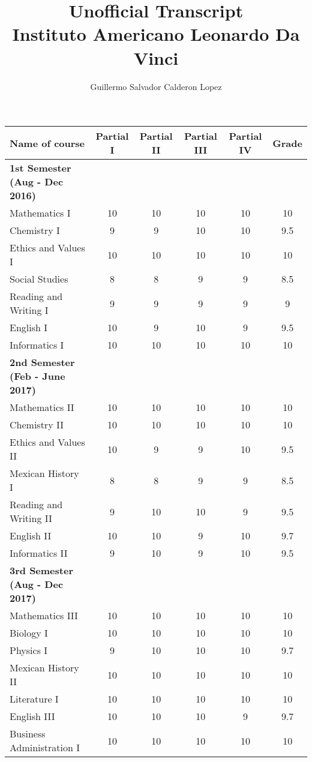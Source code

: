 \documentclass[12pt]{article}
\title{Unofficial Transcript\\
			Instituto Americano Leonardo Da Vinci}
\author{Guillermo Salvador Calderon Lopez}
\date{}
\begin{document}
\clearpage\maketitle
\thispagestyle{empty}

\begin{center}
\begin{tabular}{| l | c | c | c | c | c |}
\hline
Name of course & Partial I & Partial II & Partial III & Partial IV & Grade\\
\hline
\hline

\textbf{1st Semester (Aug - Dec 2016)} & & & & &\\
\hline
Mathematics I & 10 & 10 & 10 & 10 & 10\\
Chemistry I & 9 & 9 & 10 & 10 & 9.5\\
Ethics and Values I & 10 & 10 & 10 & 10 & 10\\
Social Studies & 8 & 8 & 9 & 9 & 8.5\\
Reading and Writing I & 9 & 9 & 9 & 9 & 9\\
English I & 10 & 9 & 10 & 9 & 9.5\\
Informatics I & 10 & 10 & 10 & 10 & 10\\
\hline
\hline

\textbf{2nd Semester (Feb - June 2017)} & & & & &\\
\hline
Mathematics II & 10 & 10 & 10 & 10 & 10\\
Chemistry II & 10 & 10 & 10 & 10 & 10\\
Ethics and Values II & 10 & 9 & 9 & 10 & 9.5\\
Mexican History I & 8 & 8 & 9 & 9 & 8.5\\
Reading and Writing II & 9 & 10 & 10 & 9 & 9.5\\
English II & 10 & 10 & 9 & 10 & 9.7\\
Informatics II & 9 & 10 & 9 & 10 & 9.5\\
\hline
\hline

\textbf{3rd Semester (Aug - Dec 2017)} & & & & &\\
\hline
Mathematics III & 10 & 10 & 10 & 10 & 10\\
Biology I & 10 & 10 & 10 & 10 & 10\\
Physics I & 9 & 10 & 10 & 10 & 9.7\\
Mexican History II & 10 & 10 & 10 & 10 & 10\\
Literature I & 10 & 10 & 10 & 10 & 10\\
English III & 10 & 10 & 10 & 9 & 9.7\\
Business Administration I & 10 & 10 & 10 & 10 & 10\\
\hline
\hline


\end{tabular}
\end{center}
\end{document}
